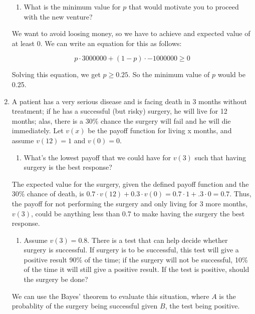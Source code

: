 \documentclass{article}
\begin{document}
\begin{enumerate}
          \begin{enumerate}[resume]
              \item What is the minimum value for $p$ that would motivate you to proceed with the new venture?
          \end{enumerate}

          We want to avoid loosing money, so we have to achieve and expected value of at least 0. We can write an equation for this as follows:

          \[p \cdot \num{3000000} + (1 - p) \cdot \num{-1000000} \geq 0\]

          Solving this equation, we get $p \geq 0.25$. So the minimum value of $p$ would be 0.25.

    \item A patient has a very serious disease and is facing death in 3 months without treatment; if he has a successful (but risky) surgery, he will live for 12 months; alas, there is a 30\% chance the surgery will fail and he will die immediately. Let $v(x)$ be the payoff function for living x months, and assume $v(12) = 1$ and $v(0) = 0$.

          \begin{enumerate}[label=(\alph*)]
              \item What's the lowest payoff that we could have for $v(3)$ such that having surgery is the best response?
          \end{enumerate}

          The expected value for the surgery, given the defined payoff function and the 30\% chance of death, is $0.7 \cdot v(12) + 0.3 \cdot v(0) = 0.7 \cdot 1 + .3 \cdot 0 = 0.7$. Thus, the payoff for not performing the surgery and only living for 3 more months, $v(3)$, could be anything less than 0.7 to make having the surgery the best response.

          \begin{enumerate}[resume]
              \item Assume $v(3) = 0.8$. There is a test that can help decide whether surgery is successful. If surgery is to be successful, this test will give a positive result 90\% of the time; if the surgery will not be successful, 10\% of the time it will still give a positive result. If the test is positive, should the surgery be done?
          \end{enumerate}

          We can use the Bayes' theorem to evaluate this situation, where $A$ is the probablity of the surgery being successful given $B$, the test being positive.


\end{enumerate}
\end{document}
